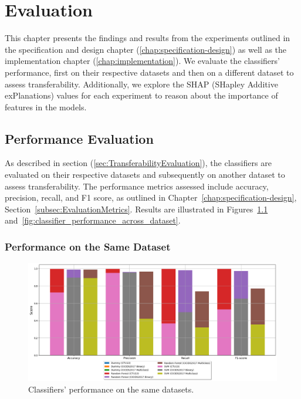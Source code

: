 \chapter{Evaluation}\label{chap:evaluation}

This chapter presents the findings and results from the experiments outlined in the specification and design chapter (\ref{chap:specification-design}) as well as the implementation chapter (\ref{chap:implementation}). We evaluate the classifiers' performance, first on their respective datasets and then on a different dataset to assess transferability. Additionally, we explore the SHAP (SHapley Additive exPlanations) values for each experiment to reason about the importance of features in the models.

\section{Performance Evaluation}\label{sec:performance-evaluation}

As described in section (\ref{sec:TransferabilityEvaluation}), the classifiers are evaluated on their respective datasets and subsequently on another dataset to assess transferability. The performance metrics assessed include accuracy, precision, recall, and F1 score, as outlined in Chapter~\ref{chap:specification-design}, Section~\ref{subsec:EvaluationMetrics}. Results are illustrated in Figures~\ref{fig:classifier_performance_same_dataset} and~\ref{fig:classifier_performance_across_dataset}.

\subsection{Performance on the Same Dataset}\label{subsec:performance-same-dataset}

\begin{figure}[H]
\centering
\includegraphics[width=\textwidth]{img/Classifier_Performance_Same_Dataset.png}
\caption{Classifiers' performance on the same datasets.}\label{fig:classifier_performance_same_dataset}
\end{figure}

